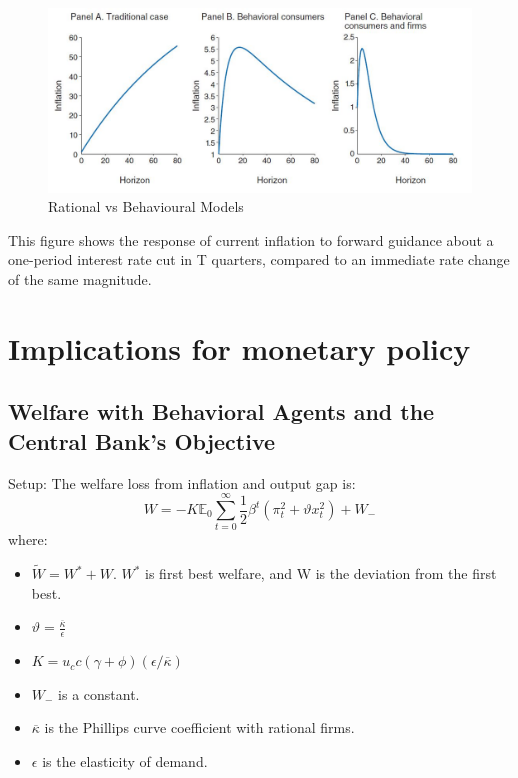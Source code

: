 \documentclass{beamer}
\newcommand\ReduceFont{\fontsize{10}{7.2}\selectfont}
\begin{document}
\begin{frame}{\subsecname}
    \begin{figure}
        \centering
        \includegraphics[scale=0.7]{Graphs_Macro/Figure2.JPG}
        \caption{Rational vs Behavioural Models}
        \label{fig:2}
    \end{figure} 
    This figure shows the response of current inflation to forward guidance about a one-period interest rate cut in T quarters, compared to an immediate rate change of the same magnitude.
\end{frame}

\section{Implications for monetary policy}
\begin{frame}
    \ReduceFont
\end{frame}

\begin{frame}
    \tableofcontents[currentsection, hideothersubsections, sections=\value{section}]
\end{frame}

\subsection{Welfare with Behavioral Agents and the Central Bank’s Objective}

\begin{frame}{\subsecname}
    Setup: The welfare loss from inflation and output gap is:
    \begin{equation}
        W=-K\mathbb{E}_{0}\sum_{t=0}^{\infty}\frac{1}{2}\beta^{t}\left(\pi_{t}^{2}+\vartheta x_{t}^{2}\right)+W_{-}
    \end{equation}
    where:
    \begin{itemize}
        \item $\widetilde{W}=W^{*}+W$. $W^{*}$ is first best welfare, and W is the deviation from the first best.
        \item $\vartheta=\frac{\overline{\kappa}}{\epsilon}$
        \item $K=u_{c}c\left(\gamma+\phi\right)\left(\epsilon/\overline{\kappa}\right)$
        \item $W_{-}$ is a constant.
        \item $\overline{\kappa}$ is the Phillips curve coefficient with rational firms.
        \item $\epsilon$ is the elasticity of demand.
    \end{itemize}
\end{frame}
\end{document}
